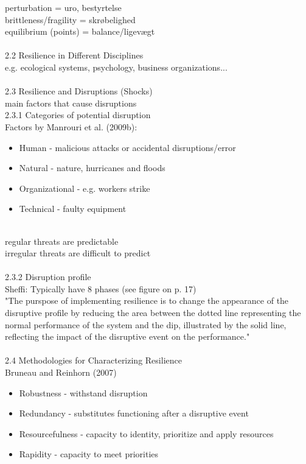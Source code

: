 \noindent
perturbation = uro, bestyrtelse \\
brittleness/fragility = skrøbelighed \\
equilibrium (points) = balance/ligevægt
\\
\\
2.2 Resilience in Different Disciplines \\
e.g. ecological systems, psychology, business organizations...
\\ \\
2.3 Resilience and Disruptions (Shocks) \\
main factors that cause disruptions
\\
2.3.1 Categories of potential disruption \\
Factors by Manrouri et al. (2009b):
\begin{itemize}
  \item Human - malicious attacks or accidental disruptions/error
  \item Natural - nature, hurricanes and floods
  \item Organizational - e.g. workers strike
  \item Technical - faulty equipment 
\end{itemize}

\noindent
\\
regular threats are predictable \\
irregular threats are difficult to predict \\
\\
2.3.2 Disruption profile \\
Sheffi: Typically have 8 phases (see figure on p. 17) \\
"The purspose of implementing resilience is to change the appearance of the disruptive profile by reducing the area between the dotted line representing the normal performance of the system and the dip, illustrated by the solid line, reflecting the impact of the disruptive event on the performance." \\
\\
2.4 Methodologies for Characterizing Resilience \\
Bruneau and Reinhorn (2007) \\
\begin{itemize}
  \item Robustness - withstand disruption
  \item Redundancy - substitutes functioning after a disruptive event
  \item Resourcefulness - capacity to identity, prioritize and apply resources
  \item Rapidity - capacity to meet priorities
\end{itemize}

